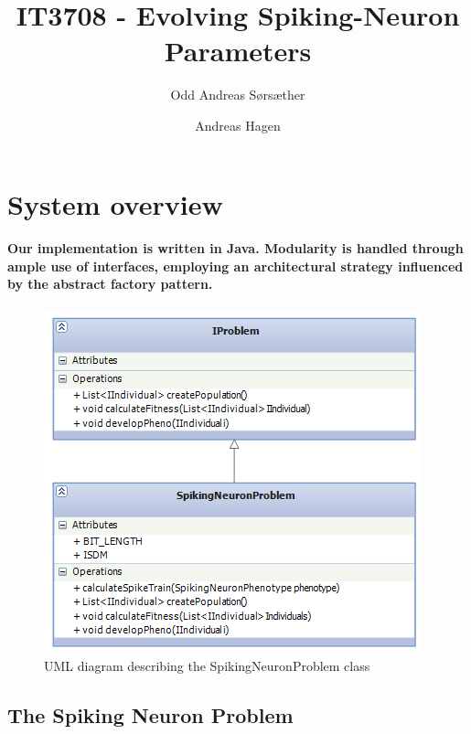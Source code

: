 \documentclass[titlepage,norsk]{article}
\title{IT3708 - Evolving Spiking-Neuron Parameters}
\author{Odd Andreas Sørsæther \and Andreas Hagen}
\begin{document}
\maketitle


\section{System overview}

\paragraph{Our implementation is written in Java. Modularity is handled through ample use of interfaces, employing an architectural strategy influenced by the abstract factory pattern.}

\begin{figure}[h!]
\centering
\includegraphics{SpikingNeuronProblem_UML.png}
\caption{UML diagram describing the SpikingNeuronProblem class}
\label{fig:awesome_image}
\end{figure}

\subsection{The Spiking Neuron Problem}
\end{document}
